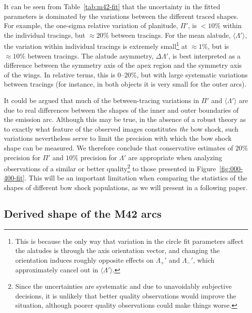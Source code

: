 It can be seen from Table~\ref{tab:m42-fit} that the uncertainty in
the fitted parameters is dominated by the variations between the
different traced shapes.  For example, the one-sigma relative
variation of planitude, \(\Pi'\), is \(< 10\%\) within the individual
tracings, but \(\approx 20\%\) between tracings.  For the mean alatude,
\(\langle\Lambda'\rangle\), the variation within individual tracings is extremely
small\footnote{%
  This is because the only way that variation in the circle fit
  parameters affect the alatudes is through the axis orientation
  vector, and changing the orientation induces roughly opposite
  effects on \(\Lambda_+'\) and \(\Lambda_-'\), which approximately cancel out in
  \(\langle\Lambda'\rangle\).  } %
at \(\approx 1\%\), but is \(\approx 10\%\) between tracings.  The alatude
asymmetry, \(\Delta\Lambda'\), is best interpreted as a difference between the
symmetry axis of the apex region and the symmetry axis of the wings.
In relative terms, this is \(0\)--\(20\%\), but with large systematic
variations between tracings (for instance, in both objects it is very
small for the outer arcs).

It could be argued that much of the between-tracing variations in
\(\Pi'\) and \(\langle\Lambda'\rangle\) are due to real differences between the shapes of
the inner and outer boundaries of the emission arc.  Although this may
be true, in the absence of a robust theory as to exactly what feature
of the observed images constitutes \emph{the} bow shock, such
variations nevertheless serve to limit the precision with which the
bow shock shape can be measured.  We therefore conclude that
conservative estimates of \(20\%\) precision for \(\Pi'\) and \(10\%\)
precision for \(\Lambda'\) are appropriate when analyzing observations of a
similar or better quality\footnote{%
  Since the uncertainties are systematic and due to unavoidably
  subjective decisions, it is unlikely that better quality
  observations would improve the situation, although poorer quality
  observations could make things worse.  } %
to those presented in Figure~\ref{fig:000-400-fit}.  This will be an
important limitation when comparing the statistics of the shapes of
different bow shock populations, as we will present in a following
paper.

\subsection{Derived shape of the M42 arcs}
\label{sec:derived-shape-m42}

